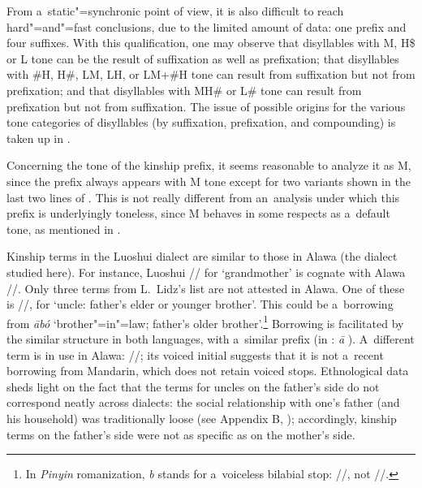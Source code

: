 	From a~static"=synchronic point of view, it is also difficult to reach hard"=and"=fast conclusions, due
	to the limited amount of data: one prefix and four suffixes. With this qualification, one may
	observe that disyllables with M, H\$ or L tone can be the result of suffixation as well as
	prefixation; that disyllables with \#H, H\#, LM, LH, or LM+\#H tone can result from suffixation but not from
	prefixation; and that disyllables with MH\# or L\# tone can result from prefixation but not from
	suffixation. The issue of possible origins for the various tone categories of disyllables (by suffixation, prefixation, and compounding) is taken up in .
	
	Concerning the tone of the kinship prefix, it seems reasonable to analyze it as M, since the prefix always appears with M tone except for two variants shown in the last two lines of . This is not really different from an~analysis under which this prefix is underlyingly toneless, since M behaves in some respects as a~default tone, as mentioned in .
	
	Kinship terms in the Luoshui dialect \citep[167]{lidz2010} are similar to those in Alawa (the dialect studied here). For instance, Luoshui //
	for ‘grandmother’ is cognate with Alawa //. Only three terms from
	L.~Lidz’s list are not attested in Alawa. One of these is //, for ‘uncle: father’s
	elder or younger brother’. This could be a~borrowing from  \textit{ābó} 
	‘brother"=in"=law; father’s older brother’.\footnote{In \textit{Pinyin} romanization, \textit{b} stands for a~voiceless bilabial stop: //, not //.} Borrowing is facilitated by the similar structure in both
	languages, with a~similar prefix (in : \textit{ā} ). A~different term is in use in
	Alawa: //; its voiced initial suggests that it is not a~recent borrowing from
	{Mandarin}, which does not retain voiced stops. Ethnological data sheds light on the fact that the terms
	for uncles on the father’s side do not correspond neatly across dialects: the social relationship
	with one’s father (and his household) was traditionally loose (see Appendix B, ); accordingly, kinship terms on the father's side were not as specific as on the mother's side. 
	
